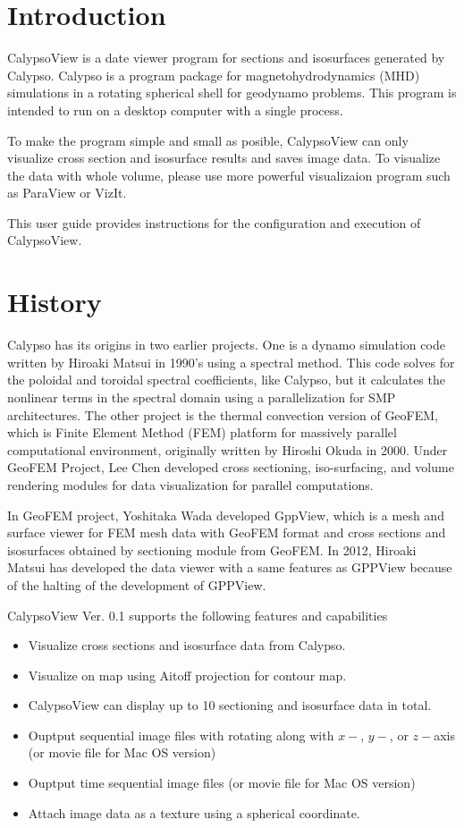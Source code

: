 \section{Introduction}
\label{section:introduction}
CalypsoView is a date viewer program for sections and isosurfaces generated by Calypso. Calypso is a program package for magnetohydrodynamics (MHD) simulations in a rotating spherical shell for geodynamo problems.  This program is intended to run on a desktop computer with a single process.

To make the program simple and small as posible, CalypsoView can only visualize cross section and isosurface results and saves image data. To visualize the data with whole volume, please use more powerful visualizaion program such as ParaView or VizIt.

This user guide provides instructions for the configuration and execution of CalypsoView.

\section{History}
\label{sec:history}
Calypso has its origins in two earlier projects. One is a dynamo simulation code written by Hiroaki Matsui in 1990's using a spectral method. This code solves for the poloidal and toroidal spectral coefficients, like Calypso, but it calculates the nonlinear terms in the spectral domain using a parallelization for SMP architectures. The other project is the thermal convection version of GeoFEM, which is Finite Element Method (FEM) platform for massively parallel computational environment, originally written by Hiroshi Okuda in 2000. Under GeoFEM Project, Lee Chen developed cross sectioning, iso-surfacing, and volume rendering modules for data visualization for parallel computations. 

In GeoFEM project, Yoshitaka Wada developed GppView, which is a mesh and surface viewer for FEM mesh data with GeoFEM format and cross sections and isosurfaces obtained by sectioning module from GeoFEM. In 2012, Hiroaki Matsui has developed the data viewer with a same features as GPPView because of the halting of the development of GPPView.

CalypsoView Ver. 0.1 supports the following features and capabilities
%
\begin{itemize}
\item Visualize cross sections and isosurface data from Calypso.
\item Visualize on map using Aitoff projection for contour map.
\item CalypsoView can display up to 10 sectioning and isosurface data in total.
\item Ouptput sequential image files with rotating along with $x-$, $y-$, or $z-$axis (or movie file for Mac OS version)
\item Ouptput time sequential image files (or movie file for Mac OS version)
\item Attach image data as a texture using a spherical coordinate.
\end{itemize}
%

